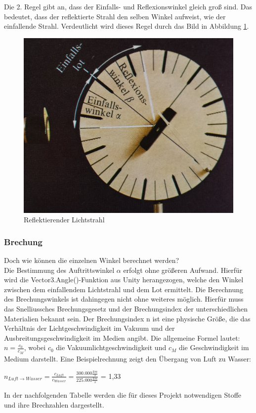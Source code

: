 Die 2. Regel gibt an, dass der Einfalls- und Reflexionswinkel gleich groß sind. Das bedeutet, dass der reflektierte Strahl den selben Winkel aufweist, wie der einfallende Strahl. Verdeutlicht wird dieses Regel durch das Bild in Abbildung \ref{reflecWinkel}.
\begin{figure}[H]
\centering
\includegraphics[scale=0.09, center]{res/reflecWinkel.jpg}
\caption{Reflektierender Lichtstrahl}
\label{reflecWinkel}
\end{figure}


\subsubsection{Brechung}

Doch wie können die einzelnen Winkel berechnet werden?\\
Die Bestimmung des Auftrittswinkel $\alpha$ erfolgt ohne größeren Aufwand. Hierfür wird die Vector3.Angle()-Funktion aus Unity herangezogen, welche den Winkel zwischen dem einfallendem Lichtstrahl und dem Lot ermittelt. Die Berechnung des Brechungswinkels ist dahingegen nicht ohne weiteres möglich. Hierfür muss das Snelliussches Brechungsgesetz und der Brechungsindex der unterschiedlichen Materialien bekannt sein. Der Brechungsindex n ist eine physische Größe, die das Verhältnis der Lichtgeschwindigkeit im Vakuum und der Ausbreitungsgeschwindigkeit im Medien angibt. Die allgemeine Formel lautet: $n = \frac{c_0}{c_M}$, wobei $c_0$ die Vakuumlichtgeschwindigkeit und $c_M$ die Geschwindigkeit im Medium darstellt. Eine Beispielrechnung zeigt den Übergang von Luft zu Wasser:
\begin{center}
$n_{Luft\rightarrow Wasser} = \frac{c_{Luft}}{c_{Wasser}} = \frac{300.000\frac{km}{s}}{225.000\frac{km}{s}}$ = 1,33
\end{center}
In der nachfolgenden Tabelle werden die für dieses Projekt notwendigen Stoffe und ihre Brechzahlen dargestellt.

